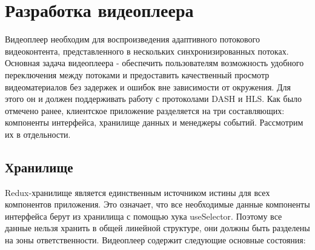 	\section{Разработка видеоплеера}

	Видеоплеер необходим для воспроизведения адаптивного потокового видеоконтента, представленного в нескольких синхронизированных потоках. Основная задача видеоплеера - обеспечить пользователям возможность удобного переключения между потоками и предоставить качественный просмотр видеоматериалов без задержек и ошибок вне зависимости от окружения. Для этого он и должен поддерживать работу с протоколами DASH и HLS. Как было отмечено ранее, клиентское приложение разделяется на три составляющих: компоненты интерфейса, хранилище данных и менеджеры событий. Рассмотрим их в отдельности.

	\subsection{Хранилище}

	Redux-хранилище является единственным источником истины для всех компонентов приложения. Это означает, что все необходимые данные компоненты интерфейса берут из хранилища с помощью хука useSelector. Поэтому все данные нельзя хранить в общей линейной структуре, они должны быть разделены на зоны ответственности. Видеоплеер содержит следующие основные состояния:

